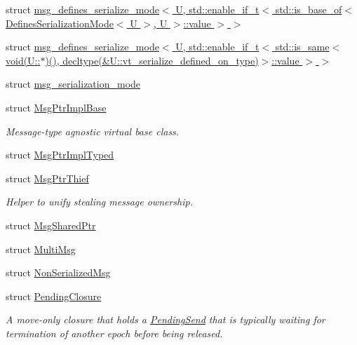 \begin{DoxyCompactItemize}
\item 
struct \hyperlink{structvt_1_1messaging_1_1msg__defines__serialize__mode_3_01_u_00_01std_1_1enable__if__t_3_01std_8698c5f7a65cc513c46123d196b4add1}{msg\+\_\+defines\+\_\+serialize\+\_\+mode$<$ U, std\+::enable\+\_\+if\+\_\+t$<$ std\+::is\+\_\+base\+\_\+of$<$ Defines\+Serialization\+Mode$<$ U $>$, U $>$\+::value $>$ $>$}
\item 
struct \hyperlink{structvt_1_1messaging_1_1msg__defines__serialize__mode_3_01_u_00_01std_1_1enable__if__t_3_01std_9ff39ec7a2238fd9d7cc614da26fbe04}{msg\+\_\+defines\+\_\+serialize\+\_\+mode$<$ U, std\+::enable\+\_\+if\+\_\+t$<$ std\+::is\+\_\+same$<$ void(\+U\+::$\ast$)(), decltype(\&\+U\+::vt\+\_\+serialize\+\_\+defined\+\_\+on\+\_\+type)$>$\+::value $>$ $>$}
\item 
struct \hyperlink{structvt_1_1messaging_1_1msg__serialization__mode}{msg\+\_\+serialization\+\_\+mode}
\item 
struct \hyperlink{structvt_1_1messaging_1_1_msg_ptr_impl_base}{Msg\+Ptr\+Impl\+Base}
\begin{DoxyCompactList}\small\item\em Message-\/type agnostic virtual base class. \end{DoxyCompactList}\item 
struct \hyperlink{structvt_1_1messaging_1_1_msg_ptr_impl_typed}{Msg\+Ptr\+Impl\+Typed}
\item 
struct \hyperlink{structvt_1_1messaging_1_1_msg_ptr_thief}{Msg\+Ptr\+Thief}
\begin{DoxyCompactList}\small\item\em Helper to unify \textquotesingle{}stealing\textquotesingle{} message ownership. \end{DoxyCompactList}\item 
struct \hyperlink{structvt_1_1messaging_1_1_msg_shared_ptr}{Msg\+Shared\+Ptr}
\item 
struct \hyperlink{structvt_1_1messaging_1_1_multi_msg}{Multi\+Msg}
\item 
struct \hyperlink{structvt_1_1messaging_1_1_non_serialized_msg}{Non\+Serialized\+Msg}
\item 
struct \hyperlink{structvt_1_1messaging_1_1_pending_closure}{Pending\+Closure}
\begin{DoxyCompactList}\small\item\em A move-\/only closure that holds a {\ttfamily \hyperlink{structvt_1_1messaging_1_1_pending_send}{Pending\+Send}} that is typically waiting for termination of another epoch before being released. \end{DoxyCompactList}\item 

\end{DoxyCompactItemize}
